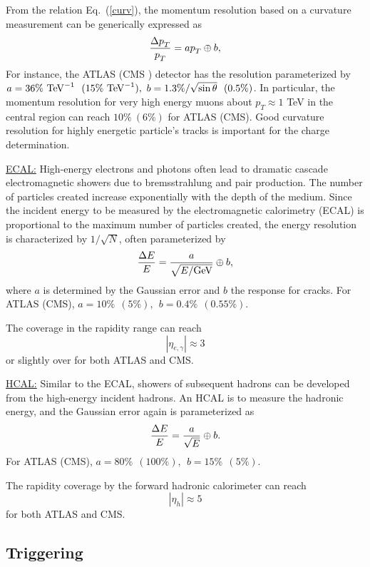 \documentclass[12pt,prd,aps,floats,preprintnumbers,preprint,superscriptaddress,floatfix,nofootinbib]{revtex4}
\def\pt{p_T^{}}
\def\gev{{\rm GeV}}
\def\tev{{\rm TeV}}
\def\be{\begin{equation}}
\def\ee{\end{equation}}
\begin{document}
From the relation Eq.~(\ref{curv}), the momentum resolution based on a
curvature measurement can be generically expressed as
\be
{\Delta \pt \over \pt} = {a \pt} \oplus {b},
\ee
For instance, the ATLAS \cite{ATLAS} (CMS \cite{CMS}) detector 
has the resolution 
parameterized by $a=36\%\ \tev^{-1}\ \ (15\%\ \tev^{-1}),\ 
b=1.3\%/\sqrt{\sin\theta}\ \ (0.5\%)$. In particular, the momentum resolution
for very high energy muons about $\pt \approx 1$ TeV in the central region 
can reach $10\%\ (6\%)$ for ATLAS (CMS). Good curvature 
resolution for highly energetic particle's tracks is important for the 
charge determination.

\vskip 0.3cm
\noindent
\underline{ECAL:} High-energy electrons and photons often lead to
dramatic cascade electromagnetic showers due to bremsstrahlung and
pair production.  The number of particles created increase exponentially
with the depth of the medium.  Since the incident energy to be measured 
by the electromagnetic calorimetry (ECAL) is
proportional to the maximum number of particles created, the energy resolution
is characterized by $1/\sqrt N$, often parameterized by
\be
{\Delta E\over E} = {a\over \sqrt{E/ \gev}} \oplus {b},
\ee
where $a$ is determined by the Gaussian error and $b$ the response
for cracks.
For ATLAS (CMS), $a=10\%\ \ (5\%),\ \ b=0.4\%\ \ (0.55\%)$.

The coverage in the rapidity range can  reach
\be
|\eta_{e,\gamma}|\approx 3
\ee
or slightly over for both ATLAS and CMS.

\vskip 0.3cm
\noindent
\underline{HCAL:} 
Similar to the ECAL, showers of subsequent hadrons  can be developed
from the high-energy incident hadrons. An HCAL is to measure the hadronic
energy, and the Gaussian error again is parameterized as
\be
{\Delta E\over E} = {a\over \sqrt E} \oplus {b}.
\ee
For ATLAS (CMS), $a=80\%\ \ (100\%),\ \ b=15\%\ \ (5\%)$.

The rapidity coverage by the forward hadronic calorimeter can  reach
\be
|\eta_h|\approx 5
\ee
for both ATLAS and CMS.



\vskip 0.2cm
\noindent
\subsection{Triggering}
\end{document}
